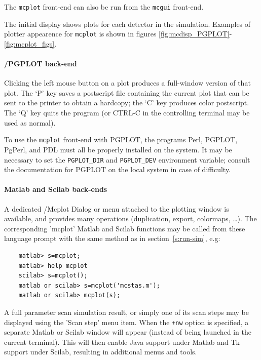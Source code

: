 The \verb+mcplot+ front-end can also be run from the \verb+mcgui+ front-end.

The initial display shows plots for each detector in the simulation.
Examples of plotter appearence for \verb+mcplot+ is shown in figures
 \ref{fig:mcdisp_PGPLOT}-\ref{fig:mcplot_figs}.

\paragraph{\MCS /PGPLOT back-end}
Clicking the left mouse button on a plot produces a full-window version
of that plot. The `P' key saves a postscript file containing the current
plot that can be sent to the printer to obtain a hardcopy; the `C' key
produces color postscript.
The `Q' key quits the program (or CTRL-C in the controlling
terminal may be used as normal).

To use the \verb+mcplot+ front-end with PGPLOT, the programs Perl, PGPLOT,
PgPerl, and PDL must all be properly installed on the system.  It may be
necessary to set the \verb+PGPLOT_DIR+ and \verb+PGPLOT_DEV+ environment
variable; consult the documentation for PGPLOT on the local system in case of
difficulty.   

\paragraph{Matlab and Scilab back-ends}

A dedicated \MCS /Mcplot Dialog or menu attached to the plotting window is available, and provides many operations (duplication, export, colormaps, \ldots).
The corresponding 'mcplot' Matlab and Scilab functions may be called from these language prompt with the same method as in section~\ref{s:run-sim}, e.g:
\begin{verbatim}
    matlab> s=mcplot;
    matlab> help mcplot
    scilab> s=mcplot();
    matlab or scilab> s=mcplot('mcstas.m');
    matlab or scilab> mcplot(s);
\end{verbatim}  
A full parameter scan simulation result, or simply one of its scan steps may be displayed using the 'Scan step' menu item.
When the \verb|+nw| option is specified, a separate Matlab or Scilab window will appear (instead of being launched in the current terminal). This will then enable Java support under Matlab and Tk support under Scilab, resulting in additional menus and tools.

